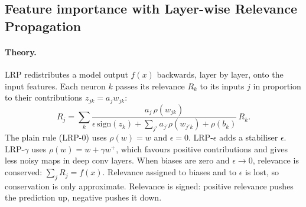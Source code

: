 \subsection{Feature importance with Layer-wise Relevance Propagation}\label{sec:lrpm}
\paragraph{Theory.} LRP \cite{bach2015,montavon2019} redistributes a model output $f(x)$ backwards, layer by layer, onto the input features. Each neuron $k$ passes its relevance $R_k$ to its inputs $j$ in proportion to their contributions $z_{jk}=a_j w_{jk}$:
\[
R_j=\sum_k \frac{a_j\,\rho(w_{jk})}{\epsilon\,\mathrm{sign}(z_k)+\sum_{j'} a_{j'}\rho(w_{j'k})+\rho(b_k)}\,R_k .
\]
The plain rule (LRP-0) uses $\rho(w)=w$ and $\epsilon=0$. LRP-$\epsilon$ adds a stabiliser $\epsilon$. LRP-$\gamma$ uses $\rho(w)=w+\gamma w^+$, which favours positive contributions and gives less noisy maps in deep conv layers. When biases are zero and $\epsilon\to0$, relevance is conserved: $\sum_j R_j=f(x)$. Relevance assigned to biases and to $\epsilon$ is lost, so conservation is only approximate. Relevance is signed: positive relevance pushes the prediction up, negative pushes it down.


